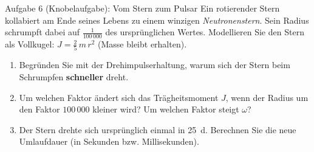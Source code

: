 \documentclass[11pt,a4paper,parskip=half]{scrartcl}
\begin{document}
\begin{sternbox}{Aufgabe 6 (Knobelaufgabe): Vom Stern zum Pulsar}
Ein rotierender Stern kollabiert am Ende seines Lebens zu einem winzigen
\emph{Neutronenstern}. Sein Radius schrumpft dabei auf $\tfrac{1}{100\,000}$
des urspr\"unglichen Wertes. Modellieren Sie den Stern als Vollkugel:
$J = \tfrac{2}{5}\,m\,r^2$ (Masse bleibt erhalten).

\begin{enumerate}[label=\alph*), leftmargin=1.5em, itemsep=1pt]
  \item Begr\"unden Sie mit der Drehimpulserhaltung, warum sich der Stern beim
        Schrumpfen \textbf{schneller} dreht.
  \item Um welchen Faktor \"andert sich das Tr\"agheitsmoment $J$, wenn der Radius
        um den Faktor $100\,000$ kleiner wird? Um welchen Faktor steigt $\omega$?
  \item Der Stern drehte sich urspr\"unglich einmal in \SI{25}{\day}.
        Berechnen Sie die neue Umlaufdauer (in Sekunden bzw. Millisekunden).
\end{enumerate}
\end{sternbox}
\end{document}
